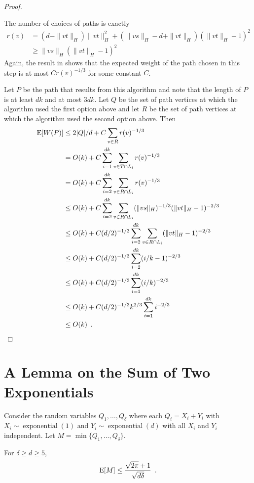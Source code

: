 \documentclass{patmorin}
\DeclareMathOperator{\exponential}{exponential}
\begin{document}
\begin{proof}
\begin{enumerate}
    The number of choices of paths is exactly
    \begin{align*}
        r(v) & = (d-\|vt\|_H)\|vt\|_H^2 
               + (\|vs\|_H-d+\|vt\|_H)(\|vt\|_H-1)^2 \\
             & \ge \|vs\|_H(\|vt\|_H-1)^2
    \end{align*}
    Again, the result in  shows that the expected
    weight of the path chosen in this step is at most $Cr(v)^{-1/3}$
    for some constant $C$.
\end{enumerate}
Let $P$ be the path that results from this algorithm and note that the
length of $P$ is at least $dk$ and at most $3dk$.  Let $Q$ be the set of
path vertices at which the algorithm used the first option above and let
$R$ be the set of path vertices at which the algorithm used the second
option above.  Then
\begin{align*}
    \mathrm{E}[W(P)] & \le 2|Q|/d + C\sum_{v\in R}r(v)^{-1/3} \\
             & = O(k) + C\sum_{i=1}^{dk}\sum_{v\in T\cap L_i}r(v)^{-1/3} \\
             & = O(k) + C\sum_{i=2}^{dk}\sum_{v\in R\cap L_i}r(v)^{-1/3} \\
             & \le O(k) + C\sum_{i=2}^{dk}\sum_{v\in R\cap L_i}(\|vs\|_H)^{-1/3}(\|vt\|_H-1)^{-2/3} \\
             & \le O(k) + C(d/2)^{-1/3}\sum_{i=2}^{dk}\sum_{v\in R\cap L_i}(\|vt\|_H-1)^{-2/3} \\
             & \le O(k) +  C(d/2)^{-1/3}\sum_{i=2}^{dk}(i/k-1)^{-2/3} \\
             & \le O(k) +  C(d/2)^{-1/3}\sum_{i=1}^{dk}(i/k)^{-2/3} \\
             & \le O(k) +  C(d/2)^{-1/3}k^{2/3}\sum_{i=1}^{dk}i^{-2/3} \\
             & \le O(k) \enspace . \qedhere
\end{align*}
\end{proof}

\section{A Lemma on the Sum of Two Exponentials}

Consider the random variables $Q_1,\ldots,Q_\delta$ where each
$Q_i=X_i+Y_i$ with $X_i\sim\exponential(1)$ and $Y_i\sim\exponential(d)$
with all $X_i$ and $Y_i$ independent.  Let $M=\min\{Q_1,\ldots,Q_\delta\}$.

\begin{lem}
   For $\delta\ge d \ge 5$, 
   \[  \mathrm{E}[M] \le \frac{\sqrt{2\pi} + 1}{\sqrt{d\delta}} \enspace . \]
\end{lem}
\end{document}
